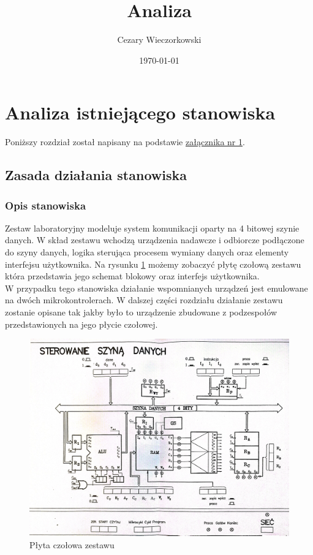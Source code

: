 \documentclass[../main.tex]{subfiles}
\author{Cezary Wieczorkowski}
\date{\today}
\title{Analiza}
\begin{document}
\section{Analiza istniejącego stanowiska}
Poniższy rozdział został napisany na podstawie \hyperref[zal:1]{załącznika nr 1}.   
\subsection{Zasada działania stanowiska}
    
    \subsubsection{Opis stanowiska}
        Zestaw laboratoryjny modeluje system komunikacji oparty na 4 bitowej szynie danych. W skład zestawu wchodzą urządzenia nadawcze i odbiorcze
        podłączone do szyny danych, logika sterująca procesem wymiany danych oraz elementy interfejsu użytkownika. Na rysunku \ref{fig:szyna_schemat} 
        możemy zobaczyć płytę czołową zestawu która przedstawia jego schemat blokowy oraz interfejs użytkownika. 
        \\
        W przypadku tego stanowiska działanie wspomnianych urządzeń jest emulowane na dwóch mikrokontrolerach. W dalszej części rozdziału
        działanie zestawu zostanie opisane tak jakby było to urządzenie zbudowane z podzespołów przedstawionych na jego płycie czołowej.

        \begin{figure}[H]
            \centering
            \includegraphics[width=\linewidth]{szyna_schemat.jpg}
            \caption{Płyta czołowa zestawu}
            \label{fig:szyna_schemat}
        \end{figure}
\end{document}
